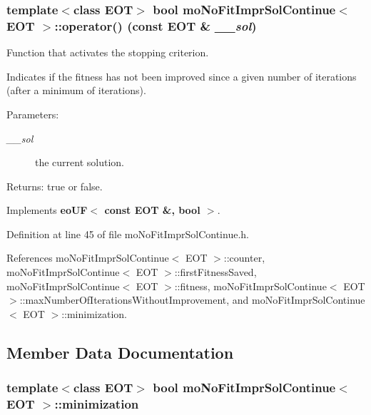 \subsubsection{\setlength{\rightskip}{0pt plus 5cm}template$<$class EOT$>$ bool {\bf moNoFitImprSolContinue}$<$ EOT $>$::operator() (const EOT \& {\em \_\-\_\-sol})\hspace{0.3cm}{\tt  [inline, virtual]}}\label{classmo_no_fit_impr_sol_continue_dbd663623cae56ec76ee504ecb226fed}


Function that activates the stopping criterion. 

Indicates if the fitness has not been improved since a given number of iterations (after a minimum of iterations). \begin{Desc}
\item[Parameters:]
\begin{description}
\item[{\em \_\-\_\-sol}]the current solution. \end{description}
\end{Desc}
\begin{Desc}
\item[Returns:]true or false. \end{Desc}


Implements {\bf eoUF$<$ const EOT \&, bool $>$}.

Definition at line 45 of file moNoFitImprSolContinue.h.

References moNoFitImprSolContinue$<$ EOT $>$::counter, moNoFitImprSolContinue$<$ EOT $>$::firstFitnessSaved, moNoFitImprSolContinue$<$ EOT $>$::fitness, moNoFitImprSolContinue$<$ EOT $>$::maxNumberOfIterationsWithoutImprovement, and moNoFitImprSolContinue$<$ EOT $>$::minimization.

\subsection{Member Data Documentation}
\subsubsection{\setlength{\rightskip}{0pt plus 5cm}template$<$class EOT$>$ bool {\bf moNoFitImprSolContinue}$<$ EOT $>$::{\bf minimization}\hspace{0.3cm}{\tt  [private]}}\label{classmo_no_fit_impr_sol_continue_2d216544c9188ec593d808c8e95208f5}


